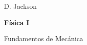 
\onecolumn  %
\thispagestyle{empty} %

\begin{flushleft}
  {\rmfamily\Large D. Jackson}\\[2cm]
  {\rmfamily\Huge\textbf{Física I}\par}\vspace{1cm}
  {\rmfamily\Large Fundamentos de Mecánica}
  \vfill
\end{flushleft}

\newpage
\twocolumn  %

